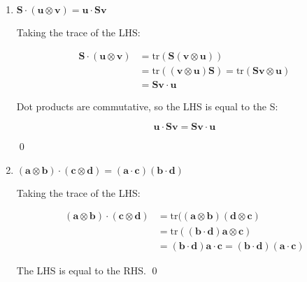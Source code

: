 \begin{problem}
\begin{enumerate}
Equation 1 are all equal. \qed
\pagebreak
        \item $\mathbf{S}\cdot(\mathbf{u}\otimes \mathbf{v})=\mathbf{u}\cdot \mathbf{S}\mathbf{v}$
        
        Taking the trace of the LHS:


\begin{align*}
\mathbf{S}\cdot(\mathbf{u}\otimes \mathbf{v})&=\text{tr}(\mathbf{S}(\mathbf{v}\otimes \mathbf{u}))\\[10pt]
&=\text{tr}((\mathbf{v}\otimes \mathbf{u})\mathbf{S})=\text{tr}(\mathbf{S\mathbf{v}}\otimes \mathbf{u})\\[10pt]
&=\mathbf{S}\mathbf{v}\cdot \mathbf{u}
\end{align*}


Dot products are commutative, so the LHS is equal to the S: 

$$
\mathbf{u}\cdot \mathbf{S}\mathbf{v}=\mathbf{S}\mathbf{v}\cdot \mathbf{u}
$$

\qed
\vspace*{1cm}
        \item $(\mathbf{a}\otimes \mathbf{b})\cdot(\mathbf{c}\otimes \mathbf{d})=(\mathbf{a}\cdot \mathbf{c})(\mathbf{b}\cdot \mathbf{d})$
        
        Taking the trace of the LHS:

        
        \begin{align*}
        (\mathbf{a}\otimes \mathbf{b})\cdot(\mathbf{c}\otimes \mathbf{d})&=\text{tr}((\mathbf{a}\otimes \mathbf{b})(\mathbf{d}\otimes \mathbf{c})\\[10pt]
        &=\text{tr}((\mathbf{b}\cdot \mathbf{d})\mathbf{a}\otimes \mathbf{c})\\[10pt]
        &=(\mathbf{b}\cdot \mathbf{d})\mathbf{a}\cdot \mathbf{c}=(\mathbf{b}\cdot \mathbf{d})(\mathbf{a}\cdot \mathbf{c})
        \end{align*}
        
        The LHS is equal to the RHS. \qed
    \end{enumerate}
\end{problem}
\pagebreak
